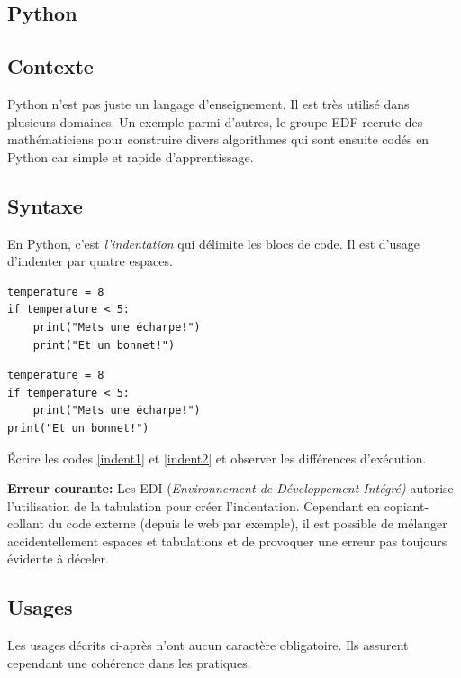 \documentclass[a4paper,11pt]{article}
\begin{document}
\begin{Form}
\section{Python}
\subsection{Contexte}
Python n'est pas juste un langage d'enseignement. Il est très utilisé dans plusieurs domaines. Un exemple parmi d'autres, le groupe EDF recrute des mathématiciens pour construire divers algorithmes qui sont ensuite codés en Python car simple et rapide d'apprentissage.
\subsection{Syntaxe}
En Python, c'est \emph{l'indentation} qui délimite les blocs de code. Il est d'usage d'indenter par quatre espaces.
\begin{code}[!h]
\begin{lstlisting}
temperature = 8
if temperature < 5:
	print("Mets une écharpe!")
	print("Et un bonnet!")
\end{lstlisting}
\label{indent1}
\end{code}
\begin{code}[!h]
\begin{lstlisting}
temperature = 8
if temperature < 5:
	print("Mets une écharpe!")
print("Et un bonnet!")
\end{lstlisting}
\label{indent2}
\end{code}


\begin{activite}
Écrire les codes \ref{indent1} et \ref{indent2} et observer les différences d'exécution.
\end{activite}
\begin{framed}
\textbf{Erreur courante:} Les EDI (\emph{Environnement de Développement Intégré)} autorise l'utilisation de la tabulation pour créer l'indentation. Cependant en copiant-collant du code externe (depuis le web par exemple), il est possible de mélanger accidentellement espaces et tabulations et de provoquer une erreur pas toujours évidente à déceler.
\end{framed}
\subsection{Usages}
Les usages décrits ci-après n'ont aucun caractère obligatoire. Ils assurent cependant une cohérence dans les pratiques.\\


\end{Form}
\end{document}
